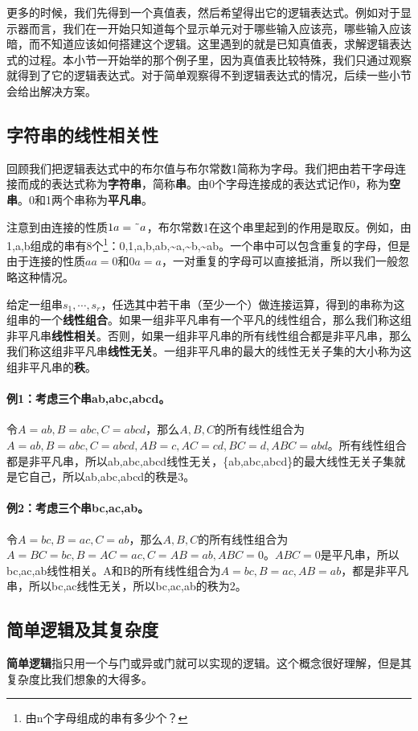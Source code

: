 更多的时候，我们先得到一个真值表，然后希望得出它的逻辑表达式。例如对于显示器而言，我们在一开始只知道每个显示单元对于哪些输入应该亮，哪些输入应该暗，而不知道应该如何搭建这个逻辑。这里遇到的就是已知真值表，求解逻辑表达式的过程。本小节一开始举的那个例子里，因为真值表比较特殊，我们只通过观察就得到了它的逻辑表达式。对于简单观察得不到逻辑表达式的情况，后续一些小节会给出解决方案。

\subsection{字符串的线性相关性}
回顾我们把逻辑表达式中的布尔值与布尔常数1简称为字母。我们把由若干字母连接而成的表达式称为\textbf{字符串}，简称\textbf{串}。由0个字母连接成的表达式记作0，称为\textbf{空串}。0和1两个串称为\textbf{平凡串}。

注意到由连接的性质$1a=\textrm{\~{}} a$，布尔常数1在这个串里起到的作用是取反。例如，由1,a,b组成的串有8个\footnote{由n个字母组成的串有多少个？}：0,1,a,b,ab,\~{}a,\~{}b,\~{}ab。一个串中可以包含重复的字母，但是由于连接的性质$aa=0$和$0a=a$，一对重复的字母可以直接抵消，所以我们一般忽略这种情况。

给定一组串$s_1,\cdots,s_r$，任选其中若干串（至少一个）做连接运算，得到的串称为这组串的一个\textbf{线性组合}。如果一组非平凡串有一个平凡的线性组合，那么我们称这组非平凡串\textbf{线性相关}。否则，如果一组非平凡串的所有线性组合都是非平凡串，那么我们称这组非平凡串\textbf{线性无关}。一组非平凡串的最大的线性无关子集的大小称为这组非平凡串的\textbf{秩}。

\paragraph*{例1：考虑三个串ab,abc,abcd。}

令$A=ab,B=abc,C=abcd$，那么$A,B,C$的所有线性组合为$A=ab,B=abc,C=abcd,AB=c,AC=cd,BC=d,ABC=abd$。所有线性组合都是非平凡串，所以ab,abc,abcd线性无关，\{ab,abc,abcd\}的最大线性无关子集就是它自己，所以ab,abc,abcd的秩是3。

\paragraph*{例2：考虑三个串bc,ac,ab。}

令$A=bc,B=ac,C=ab$，那么$A,B,C$的所有线性组合为$A=BC=bc,B=AC=ac,C=AB=ab,ABC=0$。$ABC=0$是平凡串，所以bc,ac,ab线性相关。A和B的所有线性组合为$A=bc,B=ac,AB=ab$，都是非平凡串，所以bc,ac线性无关，所以bc,ac,ab的秩为2。

\subsection{简单逻辑及其复杂度}
\textbf{简单逻辑}指只用一个与门或异或门就可以实现的逻辑。这个概念很好理解，但是其复杂度比我们想象的大得多。

